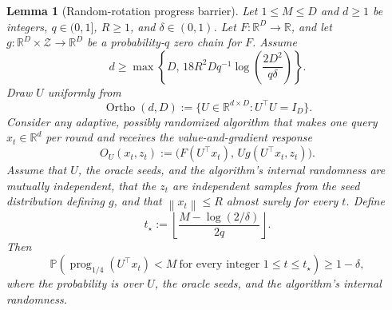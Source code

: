 \documentclass[11pt]{article}
\newtheorem{lemma}[theorem]{Lemma}
\newcommand{\R}{\mathbb{R}}
\newcommand{\Pbb}{\mathbb{P}}
\newcommand{\norm}[1]{\left\lVert #1\right\rVert}
\newcommand{\prog}{\operatorname{prog}}
\newcommand{\Ortho}{\operatorname{Ortho}}
\begin{document}
\begin{lemma}[Random-rotation progress barrier]
\label{lem:random-rotation-progress}
Let \(1\le M\le D\) and \(d\ge1\) be integers, \(q\in(0,1]\), \(R\ge1\), and \(\delta\in(0,1)\). Let
\(F:\R^D\to\R\), and let \(g:\R^D\times\mathcal Z\to\R^D\) be a probability-\(q\) zero chain for \(F\).
Assume
\[
d\ge
\max\left\{
D,\,
18R^2Dq^{-1}\log\left(\frac{2D^2}{q\delta}\right)
\right\}.
\]
Draw \(U\) uniformly from
\[
\Ortho(d,D):=\{U\in\R^{d\times D}:U^\top U=I_D\}.
\]
Consider any adaptive, possibly randomized algorithm that makes one query \(x_t\in\R^d\) per round and receives the
value-and-gradient response
\[
O_U(x_t,z_t):=\bigl(F(U^\top x_t),\,Ug(U^\top x_t,z_t)\bigr).
\]
Assume that \(U\), the oracle seeds, and the algorithm's internal randomness are mutually independent, that the
\(z_t\) are independent samples from the seed distribution defining \(g\), and that \(\norm{x_t}\le R\) almost surely
for every \(t\). Define
\[
t_\star
:=
\left\lfloor\frac{M-\log(2/\delta)}{2q}\right\rfloor.
\]
Then
\[
\Pbb\left(
\prog_{1/4}(U^\top x_t)<M
\ \text{for every integer }1\le t\le t_\star
\right)
\ge1-\delta,
\]
where the probability is over \(U\), the oracle seeds, and the algorithm's internal randomness.
\end{lemma}
\end{document}
